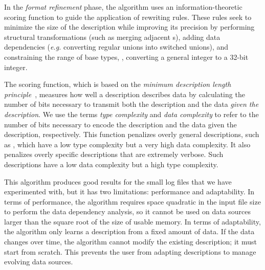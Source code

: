 In the {\em format refinement} phase,
the algorithm uses an information-theoretic scoring function to guide the
application of rewriting rules.
These rules seek to minimize the size of the description while
improving its precision by performing structural transformations (such
as merging adjacent s),  adding data dependencies ({\em e.g.}
converting regular unions into switched unions), and
constraining the range of base types, \eg{}, converting a
general integer to a 32-bit integer.  

The scoring function, which is based on the \textit{minimum
  description length principle}~\cite{mdlbook}, 
measures how well a description describes data by calculating
the number of bits necessary to transmit both the description and the
data \textit{given the description}.  We use the terms \textit{type complexity}
  and \textit{data complexity} to refer to the number of bits necessary to
encode the description and the data given the description,
respectively.  This function penalizes overly
general descriptions, such as , which have a
low type complexity but a very high data complexity.  It also
penalizes overly specific descriptions that are extremely verbose.
Such descriptions have a low data complexity but a high type 
complexity.

This algorithm produces good results for the small
log files that we have experimented with, but it has two limitations:
performance and adaptability.  In terms of performance, the algorithm
requires space quadratic in the input file size to perform the data
dependency analysis, so it cannot be used on data sources larger than the
square root of the size of usable memory. In terms of adaptability, the
algorithm only learns a description from a fixed amount of data.
If the data changes over time,
the algorithm cannot modify the existing description; 
it must start from scratch. This prevents the user from adapting
descriptions to manage evolving data sources.


%
%
%
%
